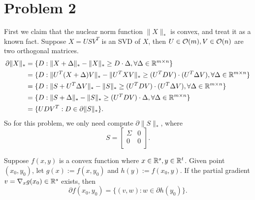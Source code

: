 \section{Problem 2}

First we claim that the nuclear norm function $\|X\|_*$ is convex,
and treat it as a known fact.
Suppose $X=USV^T$ is an SVD of $X$,
then $U\in\mathcal{O}(m), V\in\mathcal{O}(n)$ are two orthogonal matrices.
\begin{equation}
\begin{split}
    \partial \|X\|_*
        &=\{D:\|X+\Delta\|_*-\|X\|_*\ge D\cdot\Delta, \forall\Delta\in{\mathbb{R}}^{m\times n}\} \\
        &=\{D:\|U^T(X+\Delta)V\|_*-\|U^TXV\|_*\ge (U^TDV)\cdot(U^T\Delta V), \forall\Delta\in{\mathbb{R}}^{m\times n}\} \\
        &=\{D:\|S+U^T\Delta V\|_*-\|S\|_*\ge (U^TDV)\cdot(U^T\Delta V), \forall\Delta\in{\mathbb{R}}^{m\times n}\} \\
        &=\{D:\|S+\Delta\|_*-\|S\|_*\ge (U^TDV)\cdot\Delta, \forall\Delta\in{\mathbb{R}}^{m\times n}\} \\
        &=\{UDV^T: D\in\partial \|S\|_*\}.
\end{split}
\end{equation}
So for this problem,
we only need compute $\partial\|S\|_*$,
where
\begin{equation}
    S=\begin{bmatrix}
    \Sigma       & 0 \\
    0       & 0 \\
\end{bmatrix}.
\end{equation}
\begin{claim}
Suppose $f(x,y)$ is a convex function
where $x\in{\mathbb{R}}^s,y\in{\mathbb{R}}^t$.
Given point $(x_0,y_0)$,
let $g(x):=f(x,y_0)$ and $h(y):=f(x_0,y)$.
If the partial gradient $v=\nabla_x g(x_0)\in{\mathbb{R}}^s$ exists,
then
\begin{equation}
    \partial f(x_0,y_0) = \{(v,w):w\in\partial h(y_0)\}.
\end{equation}
\end{claim}
